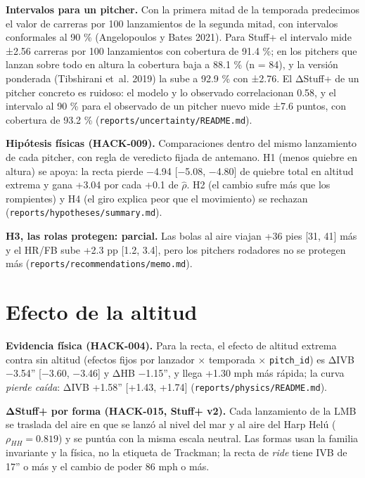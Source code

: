 \documentclass[
  english,
  spanish,
  10pt,
  letterpaper,
]{article}
\let\diablosTT\texttt
\renewcommand{\texttt}[1]{{\color{gris}\fontsize{8.2}{10}\selectfont\diablosTT{#1}}}
\begin{document}
\textbf{Intervalos para un pitcher.} Con la primera mitad de la
temporada predecimos el valor de carreras por 100 lanzamientos de la
segunda mitad, con intervalos conformales al 90 \% (Angelopoulos y Bates
2021). Para Stuff+ el intervalo mide ±2.56 carreras por 100 lanzamientos
con cobertura de 91.4 \%; en los pitchers que lanzan sobre todo en
altura la cobertura baja a 88.1 \% (n = 84), y la versión ponderada
(Tibshirani et~al. 2019) la sube a 92.9 \% con ±2.76. El ΔStuff+ de un
pitcher concreto es ruidoso: el modelo y lo observado correlacionan
0.58, y el intervalo al 90 \% para el observado de un pitcher nuevo mide
±7.6 puntos, con cobertura de 93.2 \%
(\texttt{reports/uncertainty/README.md}).

\textbf{Hipótesis físicas (HACK-009).} Comparaciones dentro del mismo
lanzamiento de cada pitcher, con regla de veredicto fijada de antemano.
H1 (menos quiebre en altura) se apoya: la recta pierde −4.94 {[}−5.08,
−4.80{]} de quiebre total en altitud extrema y gana +3.04 por cada +0.1
de \(\hat\rho\). H2 (el cambio sufre más que los rompientes) y H4 (el
giro explica peor que el movimiento) se rechazan
(\texttt{reports/hypotheses/summary.md}).

\textbf{H3, las rolas protegen: parcial.} Las bolas al aire viajan +36
pies {[}31, 41{]} más y el HR/FB sube +2.3 pp {[}1.2, 3.4{]}, pero los
pitchers rodadores no se protegen más
(\texttt{reports/recommendations/memo.md}).

\section{Efecto de la altitud}\label{efecto-de-la-altitud}

\textbf{Evidencia física (HACK-004).} Para la recta, el efecto de
altitud extrema contra sin altitud (efectos fijos por lanzador ×
temporada × \texttt{pitch\_id}) es ΔIVB −3.54'' {[}−3.60, −3.46{]} y ΔHB
−1.15'', y llega +1.30 mph más rápida; la curva \emph{pierde caída}:
ΔIVB +1.58'' {[}+1.43, +1.74{]} (\texttt{reports/physics/README.md}).

\textbf{ΔStuff+ por forma (HACK-015, Stuff+ v2).} Cada lanzamiento de la
LMB se traslada del aire en que se lanzó al nivel del mar y al aire del
Harp Helú (\(\rho_{HH}=0.819\)) y se puntúa con la misma escala neutral.
Las formas usan la familia invariante y la física, no la etiqueta de
Trackman; la recta de \emph{ride} tiene IVB de 17'' o más y el cambio de
poder 86 mph o más.
\end{document}
